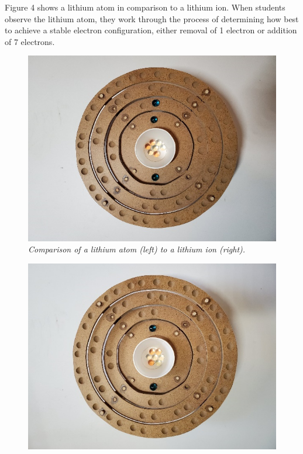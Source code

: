 \documentclass[11pt]{sig-alternate}
\begin{document}
\begin{large}
Figure 4 shows a lithium atom in comparison to a lithium ion. When students observe the lithium atom, they work through the process of determining how best to achieve a stable electron configuration, either removal of 1 electron or addition of 7 electrons.

\begin{figure}[t!]
    \centering
    \includegraphics[width=\columnwidth]{figure 4_1.png}
    \captionsetup{font=large, labelfont=it}
    \caption{\textit{Comparison of a lithium atom (left) to a lithium ion (right).}}
    \label{Figure 4}
\end{figure}
\begin{figure}[t!]
    \centering
    \includegraphics[width=\columnwidth]{figure 4_2.png}
\end{figure}


\end{large}
\end{document}
